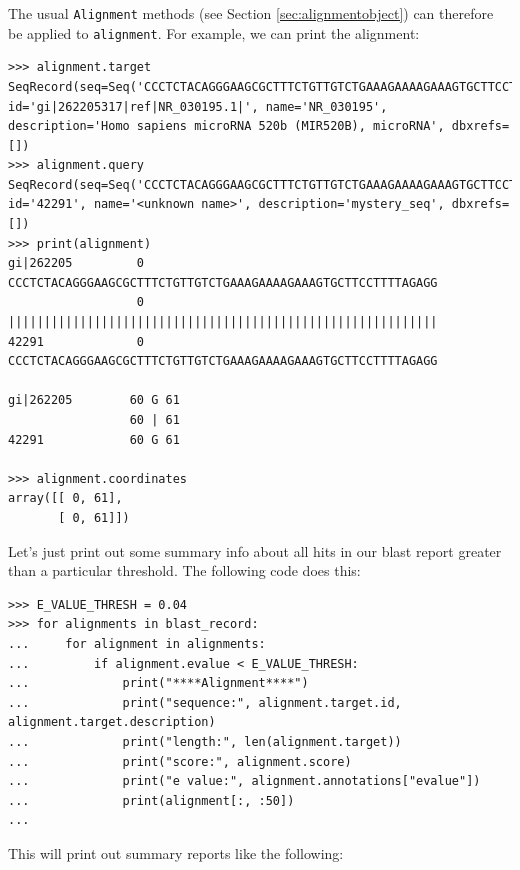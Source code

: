 The usual \verb|Alignment| methods (see Section \ref{sec:alignmentobject}) can therefore be applied to \verb|alignment|. For example, we can print the alignment:
\begin{verbatim}
>>> alignment.target
SeqRecord(seq=Seq('CCCTCTACAGGGAAGCGCTTTCTGTTGTCTGAAAGAAAAGAAAGTGCTTCCTTT...GGG'), id='gi|262205317|ref|NR_030195.1|', name='NR_030195', description='Homo sapiens microRNA 520b (MIR520B), microRNA', dbxrefs=[])
>>> alignment.query
SeqRecord(seq=Seq('CCCTCTACAGGGAAGCGCTTTCTGTTGTCTGAAAGAAAAGAAAGTGCTTCCTTT...GGG'), id='42291', name='<unknown name>', description='mystery_seq', dbxrefs=[])
>>> print(alignment)
gi|262205         0 CCCTCTACAGGGAAGCGCTTTCTGTTGTCTGAAAGAAAAGAAAGTGCTTCCTTTTAGAGG
                  0 ||||||||||||||||||||||||||||||||||||||||||||||||||||||||||||
42291             0 CCCTCTACAGGGAAGCGCTTTCTGTTGTCTGAAAGAAAAGAAAGTGCTTCCTTTTAGAGG

gi|262205        60 G 61
                 60 | 61
42291            60 G 61

>>> alignment.coordinates
array([[ 0, 61],
       [ 0, 61]])
\end{verbatim}

Let's just print out some summary info about all hits in our blast report
greater than a particular threshold. The following code does this:

\begin{verbatim}
>>> E_VALUE_THRESH = 0.04
>>> for alignments in blast_record:
...     for alignment in alignments:
...         if alignment.evalue < E_VALUE_THRESH:
...             print("****Alignment****")
...             print("sequence:", alignment.target.id, alignment.target.description)
...             print("length:", len(alignment.target))
...             print("score:", alignment.score)
...             print("e value:", alignment.annotations["evalue"])
...             print(alignment[:, :50])
...
\end{verbatim}

This will print out summary reports like the following:

